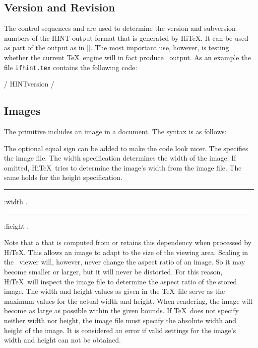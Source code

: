 \subsection{Version and Revision}
The control sequences 
and  are
used to determine the version and subversion numbers of the HINT output format
that is generated by Hi\TeX. It can be used as part of the output as 
in \verbatim|\the\HINTversion|.
The most important use, however, is testing whether the current \TeX\ engine
will in fact produce \HINT\ output.
As an example the file {\tt ifhint.tex}
contains the following code:


\verbatim/
\newif\ifhint
\expandafter\ifx\ctlname HINTversion\endcsname\relax
  \hintfalse\else\hinttrue\fi/


\subsection{Images}
The primitive 
includes an image in a document.
The syntax is as follows:

\medskip
{}  \opt{\.{=}} 
  
\medskip

The optional equal sign can be added to make the code look nicer.
The  specifies the image file.
The width specification determines the width of the image. If omitted,
Hi\TeX\ tries to determine the image's width from the image file.
The same holds for the height specification.

\medskip
\rule {}:\.{width} .
\rule {}:\.{height} .
\medskip

Note that a  that is computed from 
or  retains this dependency when processed by Hi\TeX.
This allows an image to adapt to the size of the viewing area.
Scaling in the \HINT\ viewer will, however, never change the
aspect ratio of an image. So it may become smaller or larger,
but it will never be distorted.
For this reason, Hi\TeX\ will inspect the image file to determine the
aspect ratio of the stored image.
The width and height values as given in the \TeX\ file serve
as the maximum values for the actual width and height. When rendering,
the image will become as large as possible within the given bounds.
If \TeX\ does not specify neither width nor height, the image file
must specify the absolute width and height of the image.
It is considered an error if valid settings for the image's width and height
can not be obtained.


